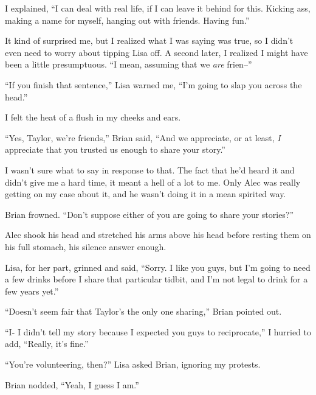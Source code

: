 I explained, ``I can deal with real life, if I can leave it behind for this.  Kicking ass, making a name for myself, hanging out with friends.  Having fun.''



It kind of surprised me, but I realized what I was saying was true, so I didn't even need to worry about tipping Lisa off.  A second later, I realized I might have been a little presumptuous.  ``I mean, assuming that we \emph{are} frien--''



``If you finish that sentence,'' Lisa warned me, ``I'm going to slap you across the head.''



I felt the heat of a flush in my cheeks and ears.



``Yes, Taylor, we're friends,'' Brian said, ``And we appreciate, or at least, \emph{I} appreciate that you trusted us enough to share your story.''



I wasn't sure what to say in response to that.  The fact that he'd heard it and didn't give me a hard time, it meant a hell of a lot to me.  Only Alec was really getting on my case about it, and he wasn't doing it in a mean spirited way.



Brian frowned.  ``Don't suppose either of you are going to share your stories?''



Alec shook his head and stretched his arms above his head before resting them on his full stomach, his silence answer enough.



Lisa, for her part, grinned and said, ``Sorry.  I like you guys, but I'm going to need a few drinks before I share that particular tidbit, and I'm not legal to drink for a few years yet.''



``Doesn't seem fair that Taylor's the only one sharing,'' Brian pointed out.



``I- I didn't tell my story because I expected you guys to reciprocate,'' I hurried to add, ``Really, it's fine.''



``You're volunteering, then?'' Lisa asked Brian, ignoring my protests.



Brian nodded, ``Yeah, I guess I am.''

















